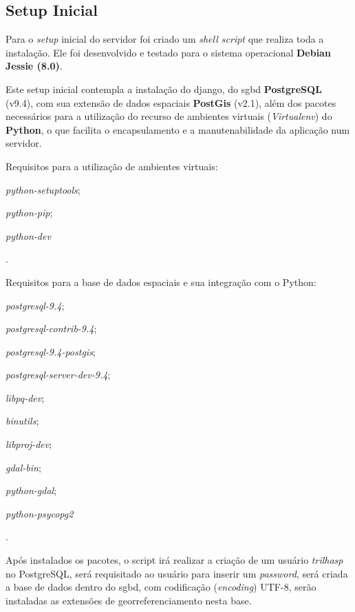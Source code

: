 \subsection{Setup Inicial}
Para o \textit{setup} inicial do servidor foi criado um \textit{shell script} que realiza toda a instalação. Ele foi desenvolvido e testado para o sistema operacional \textbf{Debian Jessie (8.0)}.

Este setup inicial contempla a instalação do \gls{django}, do \gls{sgbd} \textbf{PostgreSQL} (v9.4), com sua extensão de dados espaciais \textbf{PostGis} (v2.1), além dos pacotes necessários para a utilização do recurso de ambientes virtuais (\textit{Virtualenv}) do \textbf{Python}, o que facilita o encapsulamento e a manutenabilidade da aplicação num servidor.

Requisitos para a utilização de ambientes virtuais: %
\begin{enumerate*}[label=\itshape\alph*\upshape)] 
    \item \mbox{\textit{python-setuptools}};
    \item \mbox{\textit{python-pip}};
    \item \mbox{\textit{python-dev}}
\end{enumerate*}.

Requisitos para a base de dados espaciais e sua integração com o Python: %
\begin{enumerate*}[label=\itshape\alph*\upshape)]
    \item\mbox{\textit{postgresql-9.4}};
    \item\mbox{\textit{postgresql-contrib-9.4}};
    \item\mbox{\textit{postgresql-9.4-postgis}};
    \item\mbox{\textit{postgresql-server-dev-9.4}};
    \item\mbox{\textit{libpq-dev}};
    \item\mbox{\textit{binutils}};
    \item\mbox{\textit{libproj-dev}};
    \item\mbox{\textit{gdal-bin}};
    \item\mbox{\textit{python-gdal}};
    \item\mbox{\textit{python-psycopg2}}
\end{enumerate*}.

Após instalados os pacotes, o script irá realizar a criação de um usuário \textit{trilhasp} no PostgreSQL, será requisitado ao usuário para inserir um \textit{password}, será criada a base de dados dentro do \gls{sgbd}, com codificação (\textit{encoding}) UTF-8, serão instaladas as extensões de georreferenciamento nesta base.


